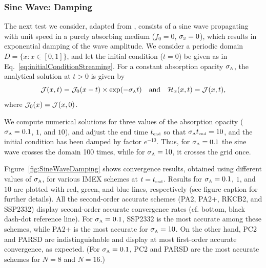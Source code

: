 \subsubsection{Sine Wave: Damping}

The next test we consider, adapted from \cite{skinnerOstriker_2013}, consists of a sine wave propagating with unit speed in a purely absorbing medium ($f_{0}=0$, $\sigma_{\mbox{\tiny S}}=0$), which results in exponential damping of the wave amplitude.  
We consider a periodic domain $D=\{x:x\in[0,1]\}$, and let the initial condition ($t=0$) be given as in Eq.~\eqref{eq:initialConditionStreaming}.  
For a constant absorption opacity $\sigma_{\mbox{\tiny A}}$, the analytical solution at $t>0$ is given by
\begin{equation}
  \mathcal{J}(x,t)=\mathcal{J}_{0}(x-t)\times\exp(-\sigma_{\mbox{\tiny A}} t)
  \quad\text{and}\quad
  \mathcal{H}_{x}(x,t)=\mathcal{J}(x,t),
\end{equation}
where $\mathcal{J}_{0}(x)=\mathcal{J}(x,0)$.  

We compute numerical solutions for three values of the absorption opacity ($\sigma_{\mbox{\tiny A}}=0.1$, $1$, and $10$), and adjust the end time $t_{\mbox{\tiny end}}$ so that $\sigma_{\mbox{\tiny A}}t_{\mbox{\tiny end}}=10$, and the initial condition has been damped by factor $e^{-10}$.  
Thus, for $\sigma_{\mbox{\tiny A}}=0.1$ the sine wave crosses the domain 100 times, while for $\sigma_{\mbox{\tiny A}}=10$, it crosses the grid once.  

Figure~\ref{fig:SineWaveDamping} shows convergence results, obtained using different values of $\sigma_{\mbox{\tiny A}}$, for various IMEX schemes at $t=t_{\mbox{\tiny end}}$.  
Results for $\sigma_{\mbox{\tiny A}}=0.1$, $1$, and $10$ are plotted with red, green, and blue lines, respectively (see figure caption for further details).  
All the second-order accurate schemes (PA2, PA2+, RKCB2, and SSP2332) display second-order accurate convergence rates (cf. bottom, black dash-dot reference line).  
For $\sigma_{\mbox{\tiny A}}=0.1$, SSP2332 is the most accurate among these schemes, while PA2+ is the most accurate for $\sigma_{\mbox{\tiny A}}=10$.  
On the other hand, PC2 and PARSD are indistinguishable and display at most first-order accurate convergence, as expected.  
(For $\sigma_{\mbox{\tiny A}}=0.1$, PC2 and PARSD are the most accurate schemes for $N=8$ and $N=16$.)

